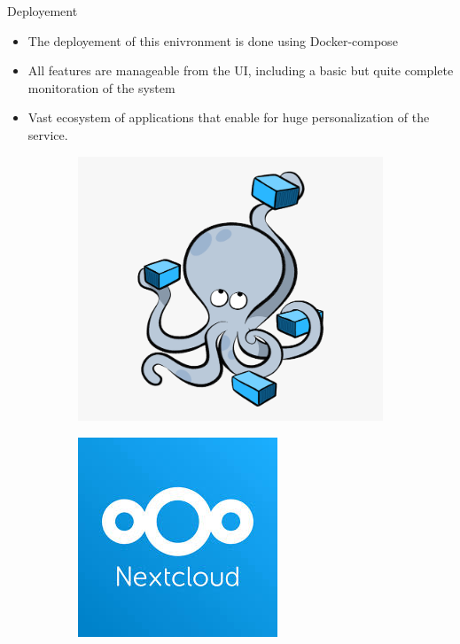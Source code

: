 \documentclass[11pt]{beamer}
\begin{document}
\begin{frame}{Deployement}
	\begin{itemize}
		\item The deployement of this enivronment is done using Docker-compose
		\item All features are manageable from the UI, including a basic but quite complete monitoration of the system
		\item Vast ecosystem of applications that enable for huge personalization of the service.
	\end{itemize}
	\begin{figure}
		\centering
		\begin{subfigure}{0.35\textwidth}
			\centering
			\label{fig:docker-compose}
			\includegraphics[width=0.7\linewidth]{docker-compose}
		\end{subfigure}
		\begin{subfigure}{0.35\textwidth}
			\centering
			\includegraphics[width=0.7\linewidth]{nextcloud}
			\label{fig:nextcloud}
		\end{subfigure}
	\end{figure}
\end{frame}
\end{document}
